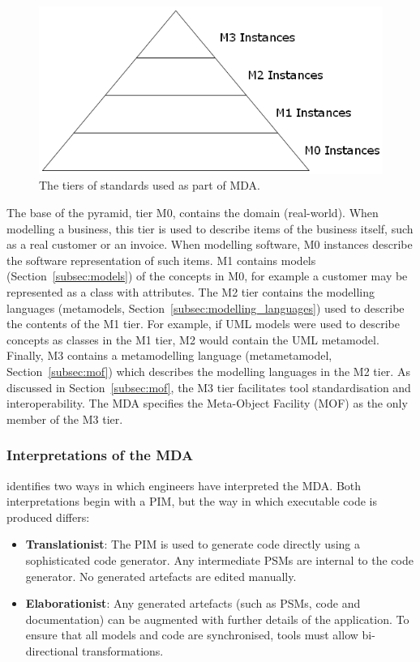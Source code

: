 \begin{figure}[htbp]
  \begin{center}
    \leavevmode
    \includegraphics[scale=0.5]{2.Background/images/mda-pyramid.png}
  \end{center}
  \caption{The tiers of standards used as part of MDA.}
  \label{fig:mda-pyramid}
\end{figure}

The base of the pyramid, tier M0, contains the domain (real-world). When modelling a business, this tier is used to describe items of the business itself, such as a real customer or an invoice. When modelling software, M0 instances describe the software representation of such items. M1 contains models (Section~\ref{subsec:models}) of the concepts in M0, for example a customer may be represented as a class with attributes. The M2 tier contains the modelling languages (metamodels, Section~\ref{subsec:modelling_languages}) used to describe the contents of the M1 tier. For example, if UML \cite{uml212} models were used to describe concepts as classes in the M1 tier, M2 would contain the UML metamodel. Finally, M3 contains a metamodelling language (metametamodel, Section~\ref{subsec:mof}) which describes the modelling languages in the M2 tier. As discussed in Section~\ref{subsec:mof}, the M3 tier facilitates tool standardisation and interoperability. The MDA specifies the Meta-Object Facility (MOF) \cite{mof} as the only member of the M3 tier.

\subsubsection{Interpretations of the MDA}
\cite{mcneile03mda} identifies two ways in which engineers have interpreted the MDA. Both interpretations begin with a PIM, but the way in which executable code is produced differs:

\begin{itemize}
 \item \textbf{Translationist}: The PIM is used to generate code directly using a sophisticated code generator. Any intermediate PSMs are internal to the code generator. No generated artefacts are edited manually.
 \item \textbf{Elaborationist}: Any generated artefacts (such as PSMs, code and documentation) can be augmented with further details of the application. To ensure that all models and code are synchronised, tools must allow bi-directional transformations.
\end{itemize}

